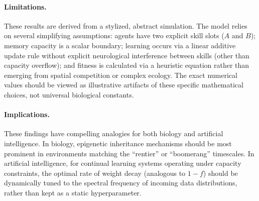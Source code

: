 \documentclass[11pt,a4paper]{article}
\begin{document}
\paragraph{Limitations.}
These results are derived from a stylized, abstract simulation. The model relies on several simplifying assumptions: agents have two explicit skill slots ($A$ and $B$); memory capacity is a scalar boundary; learning occurs via a linear additive update rule without explicit neurological interference between skills (other than capacity overflow); and fitness is calculated via a heuristic equation rather than emerging from spatial competition or complex ecology. The exact numerical values should be viewed as illustrative artifacts of these specific mathematical choices, not universal biological constants.

\paragraph{Implications.}
These findings have compelling analogies for both biology and artificial intelligence. In biology, epigenetic inheritance mechanisms should be most prominent in environments matching the ``rentier'' or ``boomerang'' timescales. In artificial intelligence, for continual learning systems operating under capacity constraints, the optimal rate of weight decay (analogous to $1 - f$) should be dynamically tuned to the spectral frequency of incoming data distributions, rather than kept as a static hyperparameter.
\end{document}
